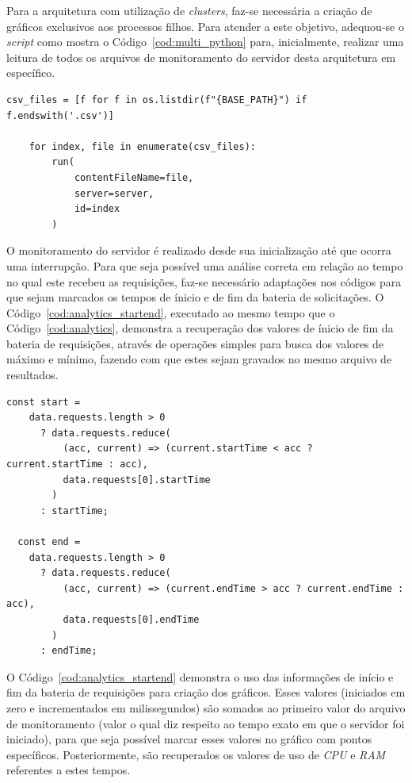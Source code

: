 \documentclass[12pt]{article}
\begin{document}
Para a arquitetura com utilização de \textit{clusters}, faz-se necessária a criação de gráficos exclusivos aos processos
filhos. Para atender a este objetivo, adequou-se o \textit{script} como mostra o Código~\ref{cod:multi_python} para, 
inicialmente, realizar uma leitura de todos os arquivos de monitoramento do servidor desta arquitetura em específico.

\begin{lstlisting}[caption={Geração dos gráficos para servidor com arquitetura de \textit{cluster}}, label=cod:multi_python]
	csv_files = [f for f in os.listdir(f"{BASE_PATH}") if f.endswith('.csv')]

	for index, file in enumerate(csv_files):
		run(
			contentFileName=file,
			server=server,
			id=index
		)
\end{lstlisting}

O monitoramento do servidor é realizado desde sua inicialização até que ocorra uma interrupção. Para que seja possível uma
análise correta em relação ao tempo no qual este recebeu as requisições, faz-se necessário adaptações nos códigos para
que sejam marcados os tempos de ínicio e de fim da bateria de solicitações. O Código~\ref{cod:analytics_startend}, executado
ao mesmo tempo que o Código~\ref{cod:analytics}, demonstra a recuperação dos valores de ínicio de fim da bateria de
requisições, através de operações simples para busca dos valores de máximo e mínimo, fazendo com que estes sejam
gravados no mesmo arquivo de resultados.

\begin{lstlisting}[caption={Recuperação dos valores de início e fim da bateria de solicitações.}, label=cod:analytics_startend]
	const start =
    data.requests.length > 0
      ? data.requests.reduce(
          (acc, current) => (current.startTime < acc ? current.startTime : acc),
          data.requests[0].startTime
        )
      : startTime;

  const end =
    data.requests.length > 0
      ? data.requests.reduce(
          (acc, current) => (current.endTime > acc ? current.endTime : acc),
          data.requests[0].endTime
        )
      : endTime;
\end{lstlisting}

O Código~\ref{cod:analytics_startend} demonstra o uso das informações de início e fim da bateria de requisições para
criação dos gráficos. Esses valores (iniciados em zero e incrementados em milissegundos) são somados ao primeiro valor do arquivo de monitoramento
(valor o qual diz respeito ao tempo exato em que o servidor foi iniciado), para que seja possível marcar esses valores no 
gráfico com pontos específicos. Posteriormente, são recuperados os valores de uso de \textit{CPU} e \textit{RAM} referentes
a estes tempos.
\end{document}
